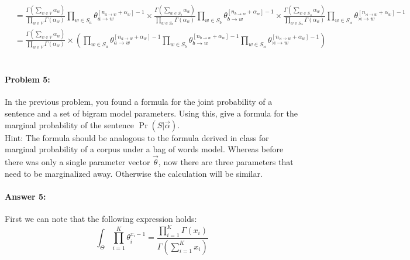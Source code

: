 \documentclass[10pt]{article}
\begin{document}
\begin{equation}
\begin{aligned}
&= {\frac {\Gamma
\left(\sum_{w \in V}\alpha _{w}\right)}{\prod _{w \in V} \Gamma (\alpha _{w})}}
\prod_{w\in S_a}{\theta}_{a \rightarrow w}^{[n_{a \rightarrow w}+\alpha_w]-1} \times 
{\frac {\Gamma
\left(\sum_{w \in S_b}\alpha _{w}\right)}{\prod _{w \in S_b} \Gamma (\alpha _{w})}}\prod_{w\in S_b} {\theta}_{b \rightarrow w}^{[n_{b \rightarrow w}+\alpha_w]-1} \times
{\frac {\Gamma
\left(\sum_{w \in S_{\rtimes}}\alpha _{w}\right)}{\prod _{w \in S_{\rtimes}} \Gamma (\alpha _{w})}}\prod_{w\in S_{\rtimes}}{\theta}_{\rtimes \rightarrow w}^{[n_{\rtimes \rightarrow w}+\alpha_w]-1} 
\\
&= {\frac {\Gamma
\left(\sum_{w \in V}\alpha _{w}\right)}{\prod _{w \in V} \Gamma (\alpha _{w})}} \times 
(\prod_{w\in S_a}
{\theta}_{a \rightarrow w}^{[n_{a \rightarrow w}+\alpha_w]-1} \prod_{w\in S_b}
{\theta}_{b \rightarrow w}^{[n_{b \rightarrow w}+\alpha_w]-1}
\prod_{w\in S_\rtimes}
{\theta}_{\rtimes \rightarrow w}^{[n_{\rtimes \rightarrow w}+\alpha_w]-1})
\end{aligned}
\end{equation}
\\
\hrulefill
\paragraph{Problem 5:}

In the previous problem, you found a formula for the joint probability
of a sentence and a set of bigram model parameters. Using this, give a
formula for the marginal probability of the sentence
$\Pr(S|\vec{\alpha})$.\\

\noindent Hint: The formula should be analogous to the formula derived
in class for marginal probability of a corpus under a bag of words
model. Whereas before there was only a single parameter vector
$\vec{\theta}$, now there are three parameters that need to be
marginalized away. Otherwise the calculation will be similar.

\paragraph{Answer 5:} First we can note that the following expression holds: 
\begin{equation}
\int_{\Theta} \prod _{i=1}^{K}\theta_{i}^{x _{i}-1}=\frac{\prod_{i=1}^{K} \Gamma(x_i)}{\Gamma(\sum_{i=1}^K x_i)}
\end{equation}
\end{document}
